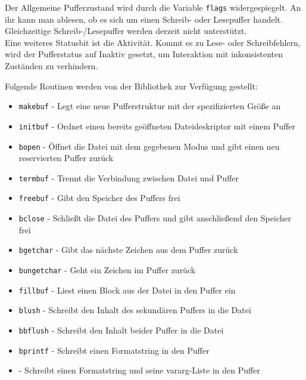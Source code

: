 Der Allgemeine Pufferzustand wird durch die Variable \texttt{flags} widergespiegelt.
An ihr kann man ablesen,
ob es sich um einen Schreib- oder Lesepuffer handelt.
Gleichzeitige Schreib-/Lesepuffer werden derzeit nicht unterstützt. \\
Eine weiteres Statusbit ist die Aktivität.
Kommt es zu Lese- oder Schreibfehlern,
wird der Pufferstatus auf Inaktiv gesetzt,
um Interaktion mit inkonsistenten Zuständen zu verhindern.

Folgende Routinen werden von der Bibliothek zur Verfügung gestellt:

\begin{itemize}
\item \texttt{makebuf} - Legt eine neue Pufferstruktur mit der spezifizierten Größe an
\item \texttt{initbuf} - Ordnet einen bereits geöffneten Dateideskriptor mit einem Puffer
\item \texttt{bopen} - Öffnet die Datei mit dem gegebenen Modus und gibt einen neu reservierten Puffer zurück
\item \texttt{termbuf} - Trennt die Verbindung zwischen Datei und Puffer
\item \texttt{freebuf} - Gibt den Speicher des Puffers frei
\item \texttt{bclose} - Schließt die Datei des Puffers und gibt anschließend den Speicher frei
\item \texttt{bgetchar} - Gibt das nächste Zeichen aus dem Puffer zurück
\item \texttt{bungetchar} - Geht ein Zeichen im Puffer zurück
\item \texttt{fillbuf} - Liest einen Block aus der Datei in den Puffer ein
\item \texttt{blush} - Schreibt den Inhalt des sekundären Puffers in die Datei
\item \texttt{bbflush} - Schreibt den Inhalt beider Puffer in die Datei
\item \texttt{bprintf} - Schreibt einen Formatstring in den Puffer
\item {} - Schreibt einen Formatstring und seine vararg-Liste in den Puffer
\end{itemize}
